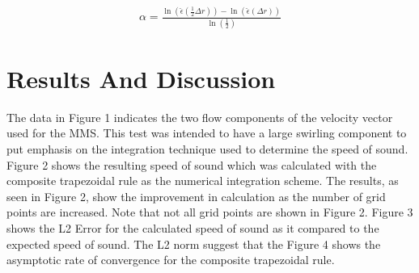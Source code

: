 \documentclass[12pt]{article}
\begin{document}
\begin{align*}
    \alpha = \frac{\ln \left( \hat{\epsilon}\left( \frac{1}{2}\Delta  r\right)
            \right) -\ln \left( \hat{\epsilon}\left( \Delta  r\right)
    \right)}{\ln \left( \frac{1}{2} \right)}
\end{align*}

\section{Results And Discussion}
% 
\begin{figure}
    \begin{center}
       
    \end{center}
\end{figure}


\begin{figure}
    \begin{center}
        
    \end{center}
\end{figure}

\begin{figure}
    \begin{center}
        
    \end{center}
\end{figure}

\begin{figure}
    \begin{center}
        
    \end{center}
\end{figure}
The data in Figure 1 indicates the two flow components of the velocity vector 
used for the MMS. This test was intended to have a large swirling component to
put emphasis on the integration technique used to determine the speed of sound.
Figure 2 shows the resulting speed of sound which was calculated
with the composite trapezoidal rule as the numerical integration scheme. The 
results, as seen in Figure 2, show the improvement in calculation as the number 
of grid points are increased. Note that not all grid points are shown in Figure 2. 
Figure 3 shows the L2 Error for the calculated speed of sound as it compared to the 
expected speed of sound. The L2 norm suggest that the  Figure 4 shows the asymptotic rate of convergence for
the composite trapezoidal rule.

\end{document}
